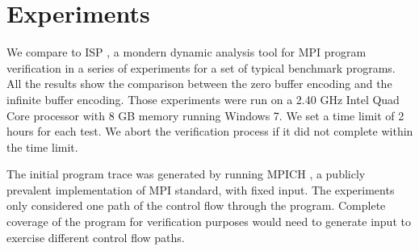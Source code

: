 \section{Experiments}
We compare to ISP \cite{}, a mondern dynamic analysis tool for MPI program verification in a series of experiments for a set of typical benchmark programs.
All the results show the comparison between the zero buffer encoding and the infinite buffer encoding.  Those experiments were run on a 2.40 GHz Intel Quad Core processor with 8 GB memory running Windows 7. We set a time limit of 2 hours for each test. We abort the verification process if it did not complete within the time limit. 

The initial program trace was generated by running MPICH \cite{mpich}, a publicly prevalent implementation of MPI standard, with fixed input. The experiments only considered one path of the control flow through the program. Complete coverage of the program for verification purposes would need to generate input to exercise different control flow paths. 

